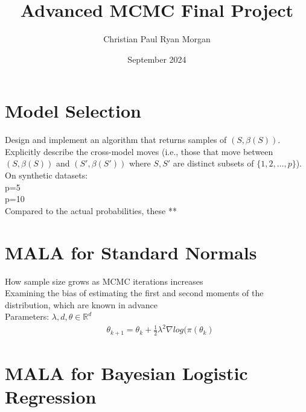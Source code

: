 \documentclass{article}
\title{Advanced MCMC Final Project}
\author{Christian Paul Ryan Morgan }
\date{September 2024}
\begin{document}
\maketitle

\section{Model Selection} 
Design and implement an algorithm that returns samples of $(S, \beta(S))$. Explicitly describe the cross-model moves (i.e., those that move between $(S, \beta(S))$ and $(S', \beta(S'))$ where $S, S'$ are distinct subsets of $\{1, 2, \dots, p\}$). \\ 

On synthetic datasets: \\
p=5 \\ 
p=10 \\
Compared to the actual probabilities, these ** \\ 


\section{MALA for Standard Normals}

How sample size grows as MCMC iterations increases \\
Examining the bias of estimating the first and second moments of the distribution, which are known in advance \\ 



Parameters: $\lambda, d, \theta \in\mathbb{R}^{d}$
\begin{align}
    & \theta_{k+1} = \theta_{k} + \frac{1}{2}\lambda^{2} \nabla log(\pi(\theta_{k}) 
\end{align}

\section{MALA for Bayesian Logistic Regression}
\end{document}
